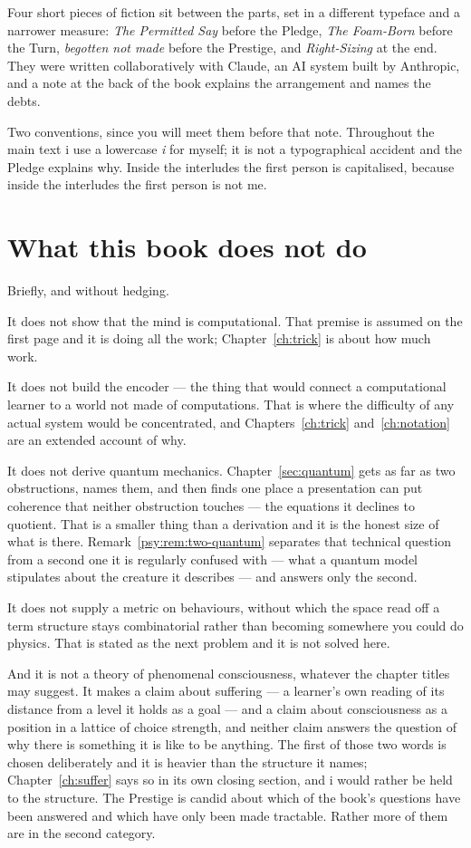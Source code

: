 Four short pieces of fiction sit between the parts, set in a
different typeface and a narrower measure: \emph{The Permitted Say}
before the Pledge, \emph{The Foam-Born} before the Turn,
\emph{begotten not made} before the Prestige, and
\emph{Right-Sizing} at the end.
They were written collaboratively with Claude, an AI system built
by Anthropic, and a note at the back of the book explains the
arrangement and names the debts.

Two conventions, since you will meet them before that note.
Throughout the main text i use a lowercase \emph{i} for myself; it
is not a typographical accident and the Pledge explains why.
Inside the interludes the first person is capitalised, because
inside the interludes the first person is not me.

\section*{What this book does not do}

Briefly, and without hedging.

It does not show that the mind is computational.
That premise is assumed on the first page and it is doing all the
work; Chapter~\ref{ch:trick} is about how much work.

It does not build the encoder --- the thing that would connect a
computational learner to a world not made of computations.
That is where the difficulty of any actual system would be
concentrated, and Chapters~\ref{ch:trick}
and~\ref{ch:notation} are an extended account of why.

It does not derive quantum mechanics.
Chapter~\ref{sec:quantum} gets as far as two obstructions, names
them, and then finds one place a presentation can put coherence
that neither obstruction touches --- the equations it declines to
quotient.
That is a smaller thing than a derivation and it is the honest size
of what is there.
Remark~\ref{psy:rem:two-quantum} separates that technical question
from a second one it is regularly confused with --- what a quantum
model stipulates about the creature it describes --- and answers only
the second.

It does not supply a metric on behaviours, without which the space
read off a term structure stays combinatorial rather than
becoming somewhere you could do physics.
That is stated as the next problem and it is not solved here.

And it is not a theory of phenomenal consciousness, whatever the
chapter titles may suggest.
It makes a claim about suffering --- a learner's own reading of its
distance from a level it holds as a goal --- and a claim about
consciousness as a position in a lattice of choice strength, and
neither claim answers the question of why there is something it is like
to be anything.
The first of those two words is chosen deliberately and it is heavier
than the structure it names; Chapter~\ref{ch:suffer} says so in its own
closing section, and i would rather be held to the structure.
The Prestige is candid about which of the book's questions have
been answered and which have only been made tractable.
Rather more of them are in the second category.

